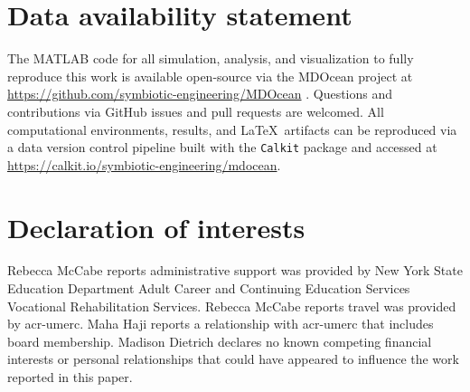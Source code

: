 \documentclass[a4paper,fleqn,colorlinks,unicode,hypertexnames=false]{cas-dc}
\begin{document}

\section*{Data availability statement}

The MATLAB code for all simulation, analysis, and visualization to fully reproduce this work is available open-source via the MDOcean project at
\url{https://github.com/symbiotic-engineering/MDOcean} \citep{mccabe_mdocean_2024}.
Questions and contributions via GitHub issues and pull requests are welcomed.
All computational environments, results, and \LaTeX~artifacts can be reproduced via a data version control pipeline built with the \texttt{Calkit} package
and accessed at \url{https://calkit.io/symbiotic-engineering/mdocean}.


\section*{Declaration of interests}
Rebecca McCabe reports administrative support was provided by New York State Education Department Adult Career and Continuing Education Services Vocational Rehabilitation Services.
Rebecca McCabe reports travel was provided by \gls{acr-umerc}.
Maha Haji reports a relationship with \gls{acr-umerc} that includes board membership. 
Madison Dietrich declares no known competing financial interests or personal relationships that could have appeared to influence the work reported in this paper.
\end{document}
